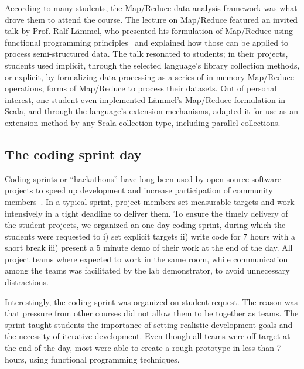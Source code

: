 \documentclass[conference]{IEEEtran}
\begin{document}
According to many students, the Map/Reduce data analysis framework was what
drove them to attend the course. The lecture on Map/Reduce featured an invited
talk by Prof. Ralf L\"ammel, who presented his formulation of Map/Reduce using
functional programming principles~\cite{Lamme08} and explained how those can be
applied to process semi-structured data. The talk resonated to students; in
their projects, students used implicit, through the selected language's library
collection methods, or explicit, by formalizing data processing as a series of
in memory Map/Reduce operations, forms of Map/Reduce to process their datasets.
Out of personal interest, one student even implemented L\"ammel's Map/Reduce
formulation in Scala, and through the language's extension mechanisms, adapted
it for use as an extension method by any Scala collection type, including
parallel collections. 

\subsection{The coding sprint day}

Coding sprints or ``hackathons'' have long been used by open source software
projects to speed up development and increase participation of community
members~\cite{Adams11}. In a typical sprint, project members set measurable
targets and work intensively in a tight deadline to deliver them. To ensure the
timely delivery of the student projects, we organized an one day coding sprint,
during which the students were requested to i) set explicit targets ii) write
code for 7 hours with a short break iii) present a 5 minute demo of their work
at the end of the day. All project teams where expected to work in the same
room, while communication among the teams was facilitated by the lab
demonstrator, to avoid unnecessary distractions.

Interestingly, the coding sprint was organized on student request. The reason
was that pressure from other courses did not allow them to be together as teams.
The sprint taught students the importance of setting realistic development goals
and the necessity of iterative development. Even though all teams were off
target at the end of the day, most were able to create a rough prototype in less
than 7 hours, using functional programming techniques. 

%
%
\end{document}
